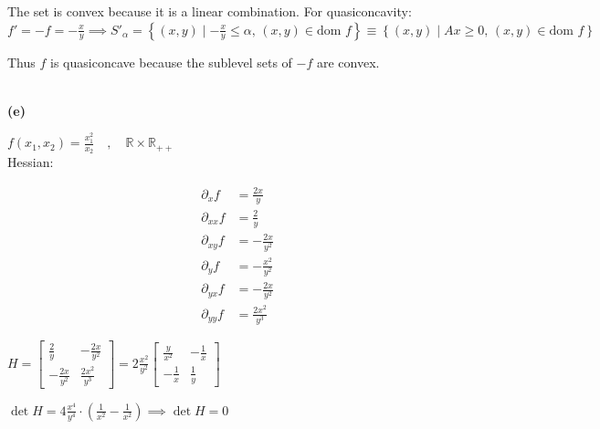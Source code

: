\documentclass{article}
\begin{document}
\noindent The set is convex because it is a linear combination.
\noindent For quasiconcavity: $f' = -f = -\frac{x}{y} \implies S'_\alpha = \left\{ (x,y) \mid -\frac{x}{y} \leq \alpha, \, (x,y) \in \text{dom } f \right\} \equiv \left\{ (x,y) \mid Ax \geq 0, \, (x,y) \in \text{dom } f \right\}$ \\

\vspace{0.5cm}

\noindent Thus $f$ is quasiconcave because the sublevel sets of $-f$ are convex.

\medskip

\\


\textbf{(e)}


\noindent $f(x_1, x_2) = \frac{x_1^2}{x_2} \quad , \quad \mathbb{R} \times \mathbb{R}_{++}$ \\[1.5em]

\noindent Hessian: \\[0.5em]
\begin{minipage}{0.3\textwidth}
\begin{align*}
\partial_x f &= \frac{2x}{y} \\
\partial_{xx} f &= \frac{2}{y} \\
\partial_{xy} f &= -\frac{2x}{y^2} \\
\partial_y f &= -\frac{x^2}{y^2} \\
\partial_{yx} f &= -\frac{2x}{y^2} \\
\partial_{yy} f &= \frac{2x^2}{y^3}
\end{align*}
\end{minipage}
\begin{minipage}{0.6\textwidth}
$H = \begin{bmatrix} \frac{2}{y} & -\frac{2x}{y^2} \\ -\frac{2x}{y^2} & \frac{2x^2}{y^3} \end{bmatrix} = 2 \frac{x^2}{y^2} \begin{bmatrix} \frac{y}{x^2} & -\frac{1}{x} \\ -\frac{1}{x} & \frac{1}{y} \end{bmatrix}$
\end{minipage}

\vspace{2em}

\noindent $\det H = 4 \frac{x^4}{y^4} \cdot \left( \frac{1}{x^2} - \frac{1}{x^2} \right) \implies \det H = 0$ \\[1.5em]
\end{document}
